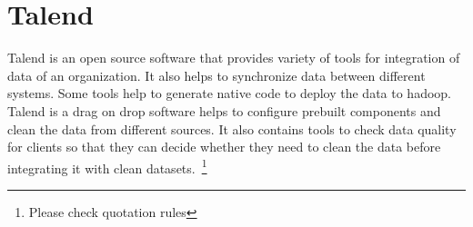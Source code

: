 \section{Talend}

Talend is an open source software that provides variety of tools for integration
 of data of an organization. It also helps to synchronize data between different
 systems. Some tools help to generate native code to deploy the data to hadoop.
Talend is a drag on drop software helps to configure prebuilt components and
clean the data from different sources. It also contains tools to check data
quality for clients so that they can decide whether they need to clean the data
before integrating it with clean datasets.~\cite{hid-sp18-502-Talend}\footnote{Please check quotation rules}


